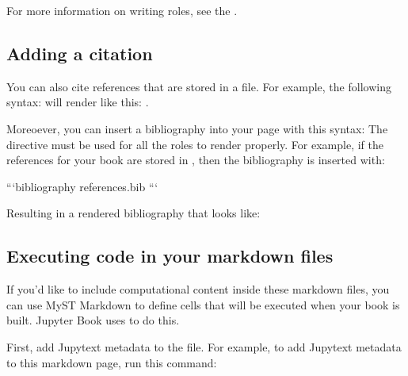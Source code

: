 \documentclass[letterpaper,10pt,english]{sphinxmanual}
\begin{document}
For more information on writing roles, see the
.


\subsection{Adding a citation}
\label{\detokenize{Part1/markdown:adding-a-citation}}
You can also cite references that are stored in a  file. For example,
the following syntax:  will render like
this: .

Moreoever, you can insert a bibliography into your page with this syntax:
The  directive must be used for all the  roles to
render properly.
For example, if the references for your book are stored in ,
then the bibliography is inserted with:

\begin{sphinxVerbatim}[commandchars=\\\{\}]
```\PYGZob{}bibliography\PYGZcb{} references.bib
```
\end{sphinxVerbatim}

Resulting in a rendered bibliography that looks like:




\subsection{Executing code in your markdown files}
\label{\detokenize{Part1/markdown:executing-code-in-your-markdown-files}}
If you’d like to include computational content inside these markdown files,
you can use MyST Markdown to define cells that will be executed when your
book is built. Jupyter Book uses  to do this.

First, add Jupytext metadata to the file. For example, to add Jupytext metadata
to this markdown page, run this command:

\begin{sphinxVerbatim}[commandchars=\\\{\}]
   
\end{sphinxVerbatim}
\end{document}
